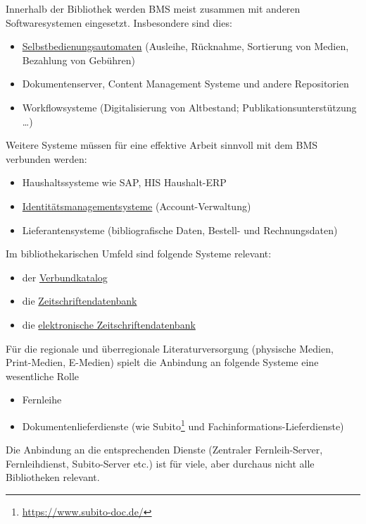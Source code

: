 \documentclass[
  11pt,
  letterpaper,
  DIV=11,
  twoside]{scrreprt}
\DeclareRobustCommand{\href}[2]{#2\footnote{\url{#1}}}
\begin{document}
Innerhalb der Bibliothek werden BMS meist zusammen mit anderen
Softwaresystemen eingesetzt. Insbesondere sind dies:

\begin{itemize}
\item
  \hyperref[automatisierung-und-selbstbedienung]{Selbstbedienungsautomaten}
  (Ausleihe, Rücknahme, Sortierung von Medien, Bezahlung von Gebühren)
\item
  Dokumentenserver, Content Management Systeme und andere Repositorien
\item
  Workflowsysteme (Digitalisierung von Altbestand;
  Publikationsunterstützung \ldots)
\end{itemize}

Weitere Systeme müssen für eine effektive Arbeit sinnvoll mit dem BMS
verbunden werden:

\begin{itemize}
\item
  Haushaltssysteme wie SAP, HIS Haushalt-ERP
\item
  \hyperref[identity-management]{Identitätsmanagementsysteme}
  (Account-Verwaltung)
\item
  Lieferantensysteme (bibliografische Daten, Bestell- und
  Rechnungsdaten)
\end{itemize}

Im bibliothekarischen Umfeld sind folgende Systeme relevant:

\begin{itemize}
\item
  der \hyperref[verbundkataloge]{Verbundkatalog}
\item
  die
  \hyperref[anbindung-an-verbundkatalogeverbundkatalogisierung]{Zeitschriftendatenbank}
\item
  die
  \hyperref[anbindung-an-verbundkatalogeverbundkatalogisierung]{elektronische
  Zeitschriftendatenbank}
\end{itemize}

Für die regionale und überregionale Literaturversorgung (physische
Medien, Print-Medien, E-Medien) spielt die Anbindung an folgende Systeme
eine wesentliche Rolle

\begin{itemize}
\item
  Fernleihe
\item
  Dokumentenlieferdienste (wie \href{https://www.subito-doc.de/}{Subito}
  und Fachinformations-Lieferdienste)
\end{itemize}

Die Anbindung an die entsprechenden Dienste (Zentraler Fernleih-Server,
Fernleihdienst, Subito-Server etc.) ist für viele, aber durchaus nicht
alle Bibliotheken relevant.
\end{document}
